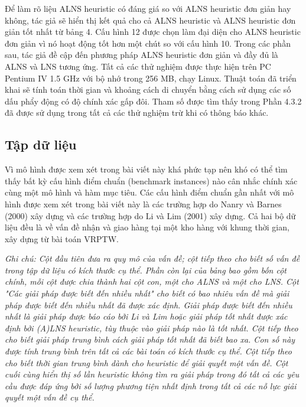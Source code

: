 Để làm rõ liệu ALNS heuristic có đáng giá so với ALNS heuristic đơn giản hay không, tác giả sẽ hiển thị kết quả cho cả ALNS heuristic và ALNS heuristic đơn giản tốt nhất từ bảng 4. Cấu hình 12 được chọn làm đại diện cho ALNS heuristic đơn giản vì nó hoạt động tốt hơn một chút so với cấu hình 10. Trong các phần sau, tác giả đề cập đến phương pháp ALNS heuristic đơn giản và đầy đủ là ALNS và LNS tương ứng.
Tất cả các thử nghiệm được thực hiện trên PC Pentium IV 1.5 GHz với bộ nhớ trong 256 MB, chạy Linux. Thuật toán đã triển khai sẽ tính toán thời gian và khoảng cách di chuyển bằng cách sử dụng các số dấu phẩy động có độ chính xác gấp đôi. Tham số được tìm thấy trong Phần 4.3.2 đã được sử dụng trong tất cả các thử nghiệm trừ khi có thông báo khác.

\subsection{Tập dữ liệu}
Vì mô hình được xem xét trong bài viết này khá phức tạp nên khó có thể tìm thấy bất kỳ cấu hình điểm chuẩn (benchmark instances) nào cân nhắc chính xác cùng một mô hình và hàm mục tiêu. Các cấu hình điểm chuẩn gần nhất với mô hình được xem xét trong bài viết này là các trường hợp do Nanry và Barnes (2000) xây dựng và các trường hợp do Li và Lim (2001) xây dựng. Cả hai bộ dữ liệu đều là về vấn đề nhận và giao hàng tại một kho hàng với khung thời gian, xây dựng từ bài toán VRPTW.


\textit{Ghi chú: Cột đầu tiên đưa ra quy mô của vấn đề; cột tiếp theo cho biết số vấn đề trong tập dữ liệu có kích thước cụ thể. Phần còn lại của bảng bao gồm bốn cột chính, mỗi cột được chia thành hai cột con, một cho ALNS và một cho LNS. Cột "Các giải pháp được biết đến nhiều nhất" cho biết có bao nhiêu vấn đề mà giải pháp được biết đến nhiều nhất đã được xác định. Giải pháp được biết đến nhiều nhất là giải pháp được báo cáo bởi Li và Lim hoặc giải pháp tốt nhất được xác định bởi (A)LNS heuristic, tùy thuộc vào giải pháp nào là tốt nhất. Cột tiếp theo cho biết giải pháp trung bình cách giải pháp tốt nhất đã biết bao xa. Con số này được tính trung bình trên tất cả các bài toán có kích thước cụ thể. Cột tiếp theo cho biết thời gian trung bình dành cho heuristic để giải quyết một vấn đề. Cột cuối cùng hiển thị số lần heuristic không tìm ra giải pháp trong đó tất cả các yêu cầu được đáp ứng bởi số lượng phương tiện nhất định trong tất cả các nỗ lực giải quyết một vấn đề cụ thể.}

